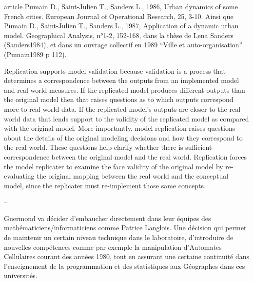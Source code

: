 



article Pumain D., Saint-Julien T., Sanders L., 1986, Urban dynamics of some French cities. European Journal of Operational Research, 25, 3-10. Ainsi que Pumain D., Saint-Julien T., Sanders L., 1987, Application of a dynamic urban model. Geographical Analysis, n°1-2, 152-168, dans la thèse de Lena Sanders (Sanders1984), et dans un ouvrage collectif en 1989 “Ville et auto-organisation” (Pumain1989 p 112).


Replication supports model validation because validation is a process that determines a correspondence between the outputs from an implemented model and real-world measures. If the replicated model produces different outputs than the original model then that raises questions as to which outputs correspond more to real world data. If the replicated model's outputs are closer to the real world data that lends support to the validity of the replicated model as compared with the original model. More importantly, model replication raises questions about the details of the original modeling decisions and how they correspond to the real world. These questions help clarify whether there is sufficient correspondence between the original model and the real world. Replication forces the model replicater to examine the face validity of the original model by re-evaluating the original mapping between the real world and the conceptual model, since the replicater must re-implement those same concepts.


--

Guermond va décider d'embaucher directement dans leur équipes des mathématiciens/informaticiens comme Patrice Langlois. Une décision qui permet de maintenir un certain niveau technique dans le laboratoire, d’introduire de nouvelles compétences comme par exemple la manipulation d'Automates Cellulaires courant des années 1980, tout en assurant une certaine continuité dans l’enseignement de la programmation et des statistiques aux Géographes dans ces universités.





